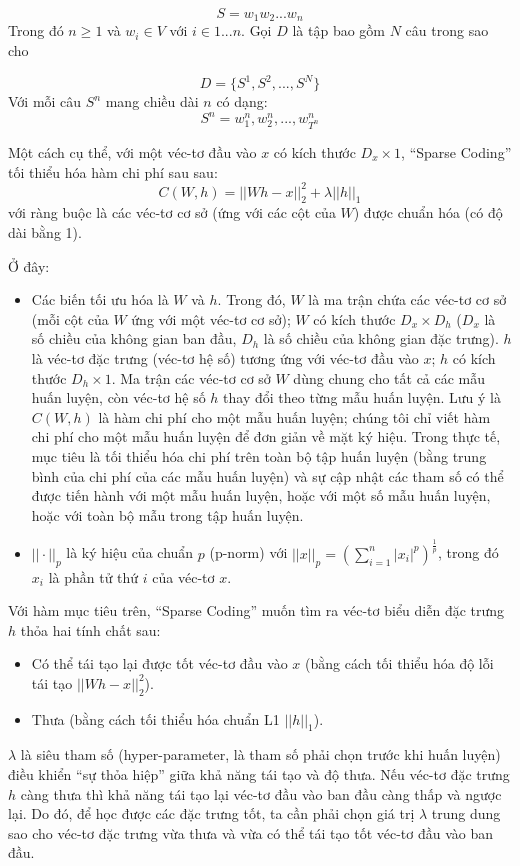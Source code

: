 $$S = w_1w_2...w_n$$
Trong đó $n \geq 1$ và $w_i \in V$ với $i \in {1...n}$. Gọi $D$ là tập bao gồm $N$ câu trong sao cho

$$D=\{S^1, S^2,...,S^N\}$$
Với mỗi câu $S^n$ mang chiều dài $n$ có dạng:
$$S^n=w^n_1, w^n_2,...,w^n_{T^n}$$

Một cách cụ thể, với một véc-tơ đầu vào $x$ có kích thước $D_x \times 1$, ``Sparse Coding'' tối thiểu hóa hàm chi phí sau sau:
\begin{equation} \label{eq_SparseCoding}
	C(W, h) = ||Wh - x||_2^2 + \lambda||h||_1
\end{equation}
với ràng buộc là các véc-tơ cơ sở (ứng với các cột của $W$) được chuẩn hóa (có độ dài bằng 1).

Ở đây:
\begin{itemize}
	\item Các biến tối ưu hóa là $W$ và $h$. Trong đó, $W$ là ma trận chứa các véc-tơ cơ sở (mỗi cột của $W$ ứng với một véc-tơ cơ sở); $W$ có kích thước $D_x \times D_h$ ($D_x$ là số chiều của không gian ban đầu, $D_h$ là số chiều của không gian đặc trưng). $h$ là véc-tơ đặc trưng (véc-tơ hệ số) tương ứng với véc-tơ đầu vào $x$; $h$ có kích thước $D_h \times 1$. Ma trận các véc-tơ cơ sở $W$ dùng chung cho tất cả các mẫu huấn luyện, còn véc-tơ hệ số $h$ thay đổi theo từng mẫu huấn luyện. Lưu ý là $C(W, h)$ là hàm chi phí cho một mẫu huấn luyện; chúng tôi chỉ viết hàm chi phí cho một mẫu huấn luyện để đơn giản về mặt ký hiệu. Trong thực tế, mục tiêu là tối thiểu hóa chi phí trên toàn bộ tập huấn luyện (bằng trung bình của chi phí của các mẫu huấn luyện) và sự cập nhật các tham số có thể được tiến hành với một mẫu huấn luyện, hoặc với một số mẫu huấn luyện, hoặc với toàn bộ mẫu trong tập huấn luyện.
	\item $||\cdot||_p$ là ký hiệu của chuẩn $p$ (p-norm) với $||x||_p=\left(\sum_{i=1}^n|x_i|^p\right)^{\frac{1}{p}}$, trong đó $x_i$ là phần tử thứ $i$ của véc-tơ $x$.
\end{itemize}

Với hàm mục tiêu trên, ``Sparse Coding'' muốn tìm ra véc-tơ biểu diễn đặc trưng $h$ thỏa hai tính chất sau:
\begin{itemize}
	\item Có thể tái tạo lại được tốt véc-tơ đầu vào $x$ (bằng cách tối thiểu hóa độ lỗi tái tạo $||Wh - x||_2^2$).
	\item Thưa (bằng cách tối thiểu hóa chuẩn L1 $||h||_1$).
\end{itemize}

$\lambda$ là siêu tham số (hyper-parameter, là tham số phải chọn trước khi huấn luyện) điều khiển ``sự thỏa hiệp'' giữa khả năng tái tạo và độ thưa. Nếu véc-tơ đặc trưng $h$ càng thưa thì khả năng tái tạo lại véc-tơ đầu vào ban đầu càng thấp và ngược lại. Do đó, để học được các đặc trưng tốt, ta cần phải chọn giá trị $\lambda$ trung dung sao cho véc-tơ đặc trưng vừa thưa và vừa có thể tái tạo tốt véc-tơ đầu vào ban đầu. 

